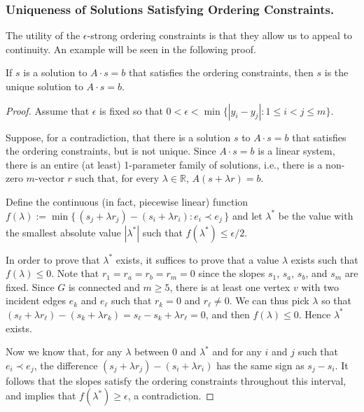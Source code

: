 \subsubsection{Uniqueness of Solutions Satisfying Ordering Constraints.}
%
The utility of the $\epsilon$-strong ordering constraints is that they
allow us to appeal to continuity. 
An example will be seen in the following proof.

\begin{lem}
	If $s$ is a solution to $A\cdot s=b$ that satisfies the ordering
	constraints, %
	then $s$ is 
	the unique solution to $A\cdot s=b$.
\end{lem}

\begin{proof}
	Assume that $\epsilon$ is fixed so that $0<\epsilon<\min\{|y_i-y_j| : 1\le i< j\le m\}$.
	
	Suppose, for a contradiction, that there is a solution $s$ to $A\cdot s=b$ that satisfies the ordering
	constraints, %
	but is not unique.  Since $A\cdot s=b$ is a linear system, there is an entire (at least) 1-parameter family of solutions,
	i.e., there is a non-zero $m$-vector $r$ such that, for every
	$\lambda\in\mathbb R$, $A(s+\lambda r)=b$.
	
	
	Define the continuous (in fact, piecewise linear) function $f(\lambda) := \min \{\, (s_j+\lambda r_j)-(s_i+\lambda r_i) : e_i \prec
	e_j\,\}$ and let $\lambda^*$ be the value with the smallest absolute value
	$|\lambda^*|$ such that
	$f(\lambda^*)\le\epsilon/2$. 
	
	In order to prove that $\lambda^*$ exists, it suffices to prove that a value $\lambda$ exists such that $f(\lambda)\le 0$. Note that $r_1=r_a=r_b=r_m=0$ since the slopes $s_1$, $s_a$, $s_b$, and $s_m$
	are fixed.
	Since $G$ is connected and $m\geq 5$, there is at least one vertex $v$ with two incident edges $e_k$
	and $e_\ell$ such that $r_k=0$ and $r_\ell\neq 0$. 
	We can thus pick $\lambda$ so that $(s_\ell+\lambda r_\ell)-(s_k+\lambda r_k)=s_\ell-s_k+\lambda r_\ell=0$,
	and then $f(\lambda)\le 0$. Hence $\lambda^*$ exists.
	
	Now we know that, for any $\lambda$ between $0$ and $\lambda^*$ and for any $i$ and $j$ such that $e_i\prec e_j$, the difference $(s_j+\lambda r_j)-(s_i+\lambda r_i)$ has the same sign as $s_j-s_i$. It follows that the slopes satisfy the ordering constraints throughout
	this interval, and
	 implies that $f(\lambda^*)\ge\epsilon$, a contradiction.
\end{proof}

